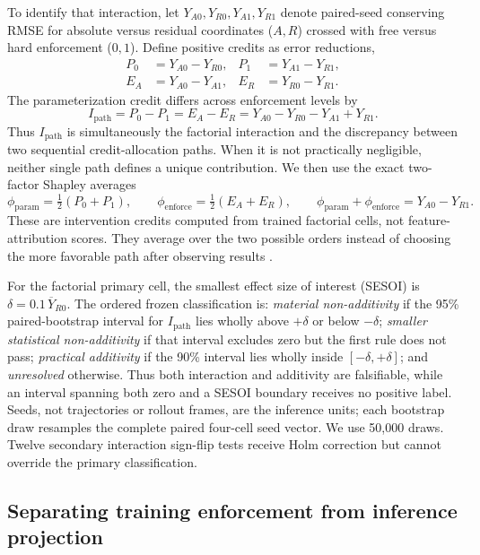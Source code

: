 \documentclass{article}
\newcommand{\Ipath}{I_{\mathrm{path}}}
\newcommand{\phiP}{\phi_{\mathrm{param}}}
\newcommand{\phiE}{\phi_{\mathrm{enforce}}}
\begin{document}
To identify that interaction, let $Y_{A0},Y_{R0},Y_{A1},Y_{R1}$ denote paired-seed conserving RMSE
for absolute versus residual coordinates ($A,R$) crossed with free versus hard enforcement
($0,1$). Define positive credits as error reductions,
\begin{align}
  P_0&=Y_{A0}-Y_{R0}, & P_1&=Y_{A1}-Y_{R1},\\
  E_A&=Y_{A0}-Y_{A1}, & E_R&=Y_{R0}-Y_{R1}.
\end{align}
The parameterization credit differs across enforcement levels by
\begin{equation}
  \Ipath=P_0-P_1=E_A-E_R=Y_{A0}-Y_{R0}-Y_{A1}+Y_{R1}.
  \label{eq:interaction}
\end{equation}
Thus $\Ipath$ is simultaneously the factorial interaction and the discrepancy between two
sequential credit-allocation paths. When it is not practically negligible, neither single path
defines a unique contribution. We then use the exact two-factor Shapley averages
\begin{equation}
  \phiP=\tfrac12(P_0+P_1),\qquad
  \phiE=\tfrac12(E_A+E_R),\qquad
  \phiP+\phiE=Y_{A0}-Y_{R1}.
  \label{eq:shapley}
\end{equation}
These are intervention credits computed from trained factorial cells, not feature-attribution
scores. They average over the two possible orders instead of choosing the more favorable path
after observing results \citep{shapley1953}.

For the factorial primary cell, the smallest effect size of interest (SESOI) is
$\delta=0.1\,\overline{Y}_{R0}$. The ordered frozen classification is: \emph{material
non-additivity} if the 95\% paired-bootstrap interval for $\Ipath$ lies wholly above $+\delta$ or
below $-\delta$; \emph{smaller statistical non-additivity} if that interval excludes zero but the
first rule does not pass; \emph{practical additivity} if the 90\% interval lies wholly inside
$[-\delta,+\delta]$; and \emph{unresolved} otherwise. Thus both interaction and additivity are
falsifiable, while an interval spanning both zero and a SESOI boundary receives no positive label.
Seeds, not trajectories or rollout frames, are the inference units; each bootstrap draw resamples
the complete paired four-cell seed vector. We use 50,000 draws. Twelve secondary interaction
sign-flip tests receive Holm correction but cannot override the primary classification.

\subsection{Separating training enforcement from inference projection}
\end{document}
